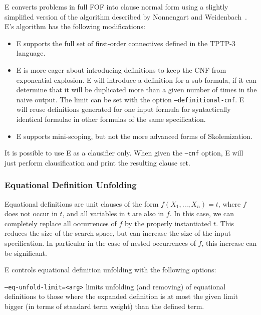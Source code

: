 \documentclass{report}
\begin{document}
E converts problems in full FOF into clause normal form using a
slightly simplified version of the algorithm described by Nonnengart
and Weidenbach~\cite{NW:SmallCNF-2001}. E's
algorithm has the following modifications:
\begin{itemize}
\item E supports the full set of first-order connectives defined in
  the TPTP-3 language.
\item E is more eager about introducing definitions to keep the CNF
  from exponential explosion. E will introduce a definition for a
  sub-formula, if it can determine that it will be duplicated more than
  a given number of times in the naive output. The limit can be set
  with the option \texttt{--definitional-cnf}. E will reuse
  definitions generated for one input formula for syntactically
  identical formulae in other formulas of the same specification.
\item E supports mini-scoping, but not the more advanced forms of
  Skolemization.
\end{itemize}

It is possible to use E as a clausifier only. When given the
\texttt{--cnf} option, E will just perform clausification and print
the resulting clause set.


\subsubsection{Equational Definition Unfolding}
\label{sec:eqdef}

Equational definitions are unit clauses of the form $f(X_1, \ldots,
X_n)=t$, where $f$ does not occur in $t$, and all variables in $t$ are
also in $f$. In this case, we can completely replace all occurrences of
$f$ by the properly instantiated $t$. This reduces the size of the
search space, but can increase the size of the input specification. In
particular in the case of nested occurrences of $f$, this increase can
be significant.

E controls equational definition unfolding with the following options:

\texttt{--eq-unfold-limit=<arg>} limits unfolding (and removing) of
equational definitions to those where the expanded definition is at
most the given limit bigger (in terms of standard term weight) than
the defined term.
\end{document}

